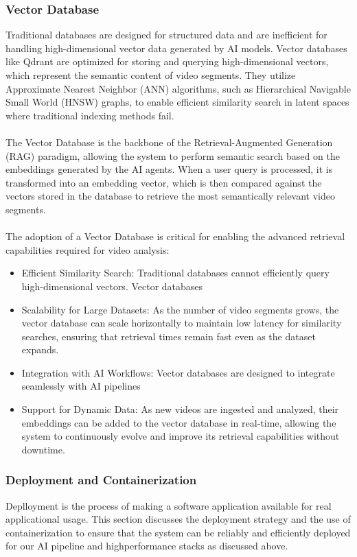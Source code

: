 \subsubsection*{Vector Database}
Traditional databases are designed for structured data and are inefficient for handling high-dimensional vector data generated by AI models. Vector databases like Qdrant are optimized for storing and querying high-dimensional vectors, which represent the semantic content of video segments. They utilize Approximate Nearest Neighbor (ANN) algorithms, such as Hierarchical Navigable Small World (HNSW) graphs, to enable efficient similarity search in latent spaces where traditional indexing methods fail.\\\\
The Vector Database is the backbone of the Retrieval-Augmented Generation (RAG) paradigm, allowing the system to perform semantic search based on the embeddings generated by the AI agents. When a user query is processed, it is transformed into an embedding vector, which is then compared against the vectors stored in the database to retrieve the most semantically relevant video segments.\\\\
The adoption of a Vector Database is critical for enabling the advanced retrieval capabilities required for video analysis:
\begin{itemize}
    \item Efficient Similarity Search: Traditional databases cannot efficiently query high-dimensional vectors. Vector databases
    \item Scalability for Large Datasets: As the number of video segments grows, the vector database can scale horizontally to maintain low latency for similarity searches, ensuring that retrieval times remain fast even as the dataset expands.
    \item Integration with AI Workflows: Vector databases are designed to integrate seamlessly with AI pipelines
    \item Support for Dynamic Data: As new videos are ingested and analyzed, their embeddings can be added to the vector database in real-time, allowing the system to continuously evolve and improve its retrieval capabilities without downtime.
\end{itemize}

\subsubsection{Deployment and Containerization}
Deplloyment is the process of making a software application available for real applicational usage. This section discusses the deployment strategy and the use of containerization to ensure that the system can be reliably and efficiently deployed for our AI pipeline and high\-performance stacks as discussed above.

